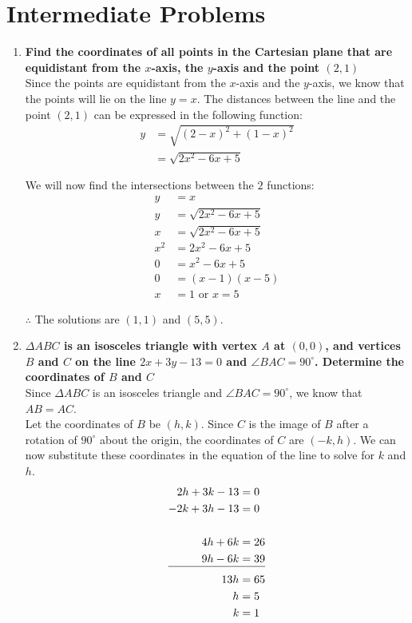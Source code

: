 \documentclass[12pt]{article}
\begin{document}
\section*{Intermediate Problems}
\begin{enumerate}
    \item \textbf{Find the coordinates of all points in the Cartesian plane that are equidistant from the $x$-axis, the $y$-axis and the point $(2, 1)$} \\
    
    Since the points are equidistant from the $x$-axis and the $y$-axis, we know that the points will lie on the line $y=x$. The distances between the line and the point $(2, 1)$ can be expressed in the following function:
    \begin{align*}
        y &= \sqrt{(2 - x)^2 + (1 - x)^2} \\
        &= \sqrt{2x^2 - 6x + 5}
    \end{align*}
    
    We will now find the intersections between the $2$ functions:
    \begin{align*}
        y &= x \\
        y &= \sqrt{2x^2 - 6x + 5} \\
        x &= \sqrt{2x^2 - 6x + 5} \\
        x^2 & = 2x^2 - 6x + 5 \\
        0 &= x^2 - 6x + 5 \\
        0 &= (x - 1)(x - 5) \\
        x &= 1 \text{ or } x = 5
    \end{align*}    

    $\therefore$ The solutions are $(1, 1)$ and $(5, 5)$.
    
    \item \textbf{$\Delta ABC$ is an isosceles triangle with vertex $A$ at $(0, 0)$, and vertices $B$ and $C$ on the line $2x+3y-13 = 0$ and $\angle BAC = 90^{\circ}$. Determine the coordinates of $B$ and $C$} \\
    
    Since $\Delta ABC$ is an isosceles triangle and $\angle BAC = 90^{\circ}$, we know that $AB = AC$. \\
    
    Let the coordinates of $B$ be $(h, k)$. Since $C$ is the image of $B$ after a rotation of $90^{\circ}$ about the origin, the coordinates of $C$ are $(-k, h)$. We can now substitute these coordinates in the equation of the line to solve for $k$ and $h$.
    \begin{align*}
        2h+3k-13&=0 \\
        -2k+3h-13&=0 \\ \\
        4h+6k&=26 \\
        9h-6k&=39 \\[-11pt]
        \cline{1-2}
        13h&=65 \\
        h&=5 \\
        k&=1
    \end{align*}
    

\end{enumerate}
\end{document}
